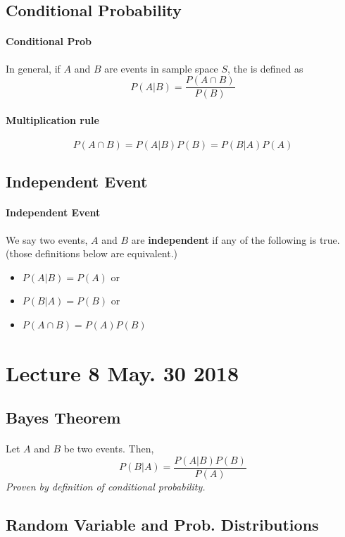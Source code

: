 \documentclass{article}
\begin{document}
		\subsection{Conditional Probability}
		\paragraph{Conditional Prob} In general, if $A$ and $B$ are events in sample space $S$, the  is defined as 
			\[
				P(A \vert B) = \frac{P(A \cap B)}{P(B)}
			\]
		\paragraph{Multiplication rule}
			\[
				P(A \cap B) = P(A \vert B) P(B) = P(B \vert A) P(A)
			\]
		
		\subsection{Independent Event}
		\paragraph{Independent Event} We say two events, $A$ and $B$ are \textbf{independent} if any of the following is true. (those definitions below are equivalent.)
			\begin{itemize}
				\item $P(A \vert B) = P(A)$ or
				\item $P(B \vert A) = P(B)$ or
				\item $P(A \cap B) = P(A) P(B)$
			\end{itemize}
			
	\section{Lecture 8 May. 30 2018}
		\subsection{Bayes Theorem}
		\paragraph{} Let $A$ and $B$ be two events. Then,
		\[
			P(B\vert A) = \frac{P(A \vert B)P(B)}{P(A)}
		\]
		\emph{Proven by definition of conditional probability.}
		
		\subsection{Random Variable and Prob. Distributions}
\end{document}

